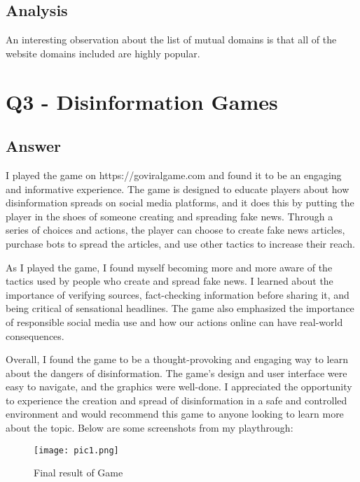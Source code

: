 \documentclass[12pt]{article}
\begin{document}
\subsection*{Analysis}

An interesting observation about the list of mutual domains is that all of the website domains included are highly popular.
 
\clearpage

\section*{Q3 - Disinformation Games}

\subsection*{Answer}

I played the game on https://goviralgame.com and found it to be an engaging and informative experience. The game is designed to educate players about how disinformation spreads on social media platforms, and it does this by putting the player in the shoes of someone creating and spreading fake news. Through a series of choices and actions, the player can choose to create fake news articles, purchase bots to spread the articles, and use other tactics to increase their reach.

As I played the game, I found myself becoming more and more aware of the tactics used by people who create and spread fake news. I learned about the importance of verifying sources, fact-checking information before sharing it, and being critical of sensational headlines. The game also emphasized the importance of responsible social media use and how our actions online can have real-world consequences.

Overall, I found the game to be a thought-provoking and engaging way to learn about the dangers of disinformation. The game's design and user interface were easy to navigate, and the graphics were well-done. I appreciated the opportunity to experience the creation and spread of disinformation in a safe and controlled environment and would recommend this game to anyone looking to learn more about the topic. Below are some screenshots from my playthrough:


\begin{figure}[h]
\caption{Final result of Game}
\centering
\texttt{[image: pic1.png]}
\end{figure}
 
\end{document}
